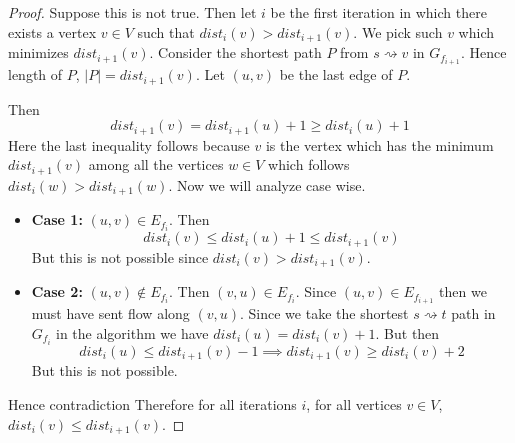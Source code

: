 \begin{proof}
	Suppose this is not true. Then let $i$ be the first iteration in which there exists a vertex $v\in V$ such that $\textit{dist}_i(v)>\textit{dist}_{i+1}(v)$. We pick such $v$ which minimizes $\textit{dist}_{i+1}(v)$. Consider the shortest path $P$ from $s\rightsquigarrow v$ in $G_{f_{i+1}}$. Hence length of $P$, $|P|=\textit{dist}_{i+1}(v)$. Let $(u,v)$ be the last edge of $P$. 
	\begin{center}
	\end{center}
	Then $$\textit{dist}_{i+1}(v)=\textit{dist}_{i+1}(u)+1\geq \textit{dist}_i(u)+1$$Here the last inequality follows because $v$ is the vertex which has the minimum $\textit{dist}_{i+1}(v)$ among all the vertices $w\in V$ which follows $\textit{dist}_i(w)>\textit{dist}_{i+1}(w)$. Now we will analyze case wise.\begin{itemize}
		\item \textbf{Case 1:} $(u,v)\in E_{f_i}$. Then $$\textit{dist}_i(v)\leq \textit{dist}_{i}(u)+1\leq \textit{dist}_{i+1}(v)$$But this is not possible since $\textit{dist}_i(v)>\textit{dist}_{i+1}(v)$. 
		\item \textbf{Case 2:} $(u,v)\notin E_{f_i}$. Then $(v,u)\in E_{f_i}$. Since $(u,v)\in E_{f_{i+1}}$ then we must have sent flow along $(v,u)$. Since we take the shortest $s\rightsquigarrow t$ path in $G_{f_i}$ in the algorithm we have $\textit{dist}_i(u)=\textit{dist}_i(v)+1$. But then $$\textit{dist}_i(u)\leq \textit{dist}_{i+1}(v)-1\implies \textit{dist}_{i+1}(v)\geq \textit{dist}_i(v)+2$$But this is not possible.
	\end{itemize}
Hence contradiction \ctr Therefore for all iterations $i$, for all vertices $v\in V$, $\textit{dist}_i(v)\leq \textit{dist}_{i+1}(v)$.
\end{proof}

